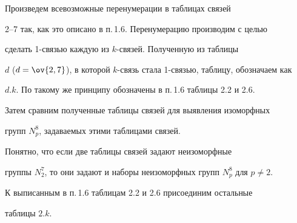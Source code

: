 Произведем всевозможные перенумерации в таблицах связей


2--7 так, как это описано в п.\,1.6. Перенумерацию производим с целью 


сделать 1-связью каждую из $k$-связей. Полученную из таблицы


$d$ ($d=\ov{2,7}$), в которой $k$-связь стала 1-связью, таблицу, обозначаем как


$d.k$. По такому же принципу обозначены в п.\,1.6 таблицы 2.2 и 2.6.


Затем сравним полученные таблицы связей для выявления изоморфных


групп $N^8_p$, задаваемых этими таблицами связей.





Понятно, что если две таблицы связей задают неизоморфные 


группы $N^7_2$, то они задают и наборы неизоморфных групп $N^8_p$ для $p\ne2$.





К выписанным в п.\,1.6 таблицам 2.2 и 2.6 присоединим остальные


таблицы $2.k$.


\smallskip





